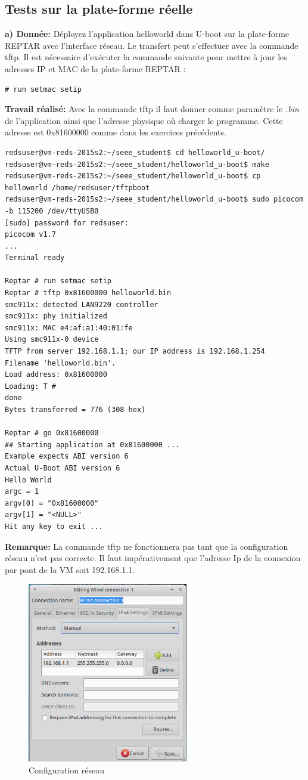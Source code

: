 \subsection{Tests sur la plate-forme réelle}
\textbf{a) Donnée: }Déployez l'application helloworld dans U-boot sur la plate-forme REPTAR avec l'interface réseau.
Le transfert peut s'effectuer avec la commande tftp.
Il est nécessaire d’exécuter la commande suivante pour mettre à jour les adresses IP et MAC de la plate-forme
REPTAR : 
\begin{lstlisting}
# run setmac setip 
\end{lstlisting}
\textbf{Travail réalisé: }Avec la commande tftp il faut donner comme paramètre le \textit{.bin} de l'application ainsi que l'adresse physique où charger le programme. Cette adresse est 0x81600000 comme dans les exercices précédents.
\begin{lstlisting}
redsuser@vm-reds-2015s2:~/seee_student$ cd helloworld_u-boot/
redsuser@vm-reds-2015s2:~/seee_student/helloworld_u-boot$ make
redsuser@vm-reds-2015s2:~/seee_student/helloworld_u-boot$ cp helloworld /home/redsuser/tftpboot
redsuser@vm-reds-2015s2:~/seee_student/helloworld_u-boot$ sudo picocom -b 115200 /dev/ttyUSB0 
[sudo] password for redsuser: 
picocom v1.7
...
Terminal ready

Reptar # run setmac setip
Reptar # tftp 0x81600000 helloworld.bin
smc911x: detected LAN9220 controller
smc911x: phy initialized
smc911x: MAC e4:af:a1:40:01:fe
Using smc911x-0 device
TFTP from server 192.168.1.1; our IP address is 192.168.1.254
Filename 'helloworld.bin'.
Load address: 0x81600000
Loading: T #
done
Bytes transferred = 776 (308 hex)

Reptar # go 0x81600000
## Starting application at 0x81600000 ...
Example expects ABI version 6
Actual U-Boot ABI version 6
Hello World
argc = 1
argv[0] = "0x81600000"
argv[1] = "<NULL>"
Hit any key to exit ... 
\end{lstlisting}
\textbf{Remarque: }La commande tftp ne fonctionnera pas tant que la configuration réseau n'est pas correcte. Il faut impérativement que l'adresse Ip de la connexion par pont de la VM soit 192.168.1.1.
\begin{figure}[H]
	\begin{center}
		\includegraphics[width=7cm]{img/ipConfig.png}
		\caption{Configuration réseau}
		\label{ipConfig}
	\end{center}
\end{figure}

